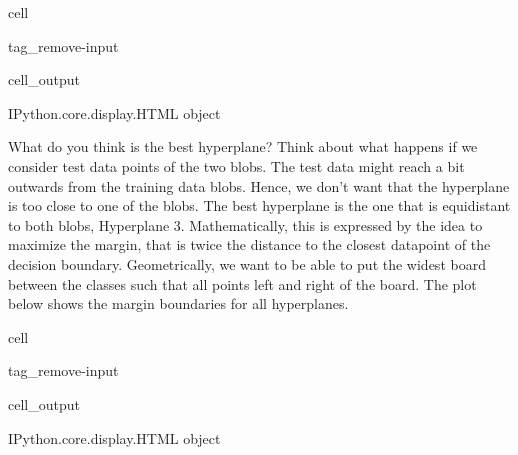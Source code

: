 \documentclass[letterpaper,10pt,english]{jupyterBook}
\begin{document}
\begin{sphinxuseclass}{cell}
\begin{sphinxuseclass}{tag_remove-input}\begin{sphinxVerbatimOutput}

\begin{sphinxuseclass}{cell_output}
\begin{sphinxVerbatim}[commandchars=\\\{\}]
\PYGZlt{}IPython.core.display.HTML object\PYGZgt{}
\end{sphinxVerbatim}

\end{sphinxuseclass}\end{sphinxVerbatimOutput}

\end{sphinxuseclass}
\end{sphinxuseclass}
\sphinxAtStartPar
What do you think is the best hyperplane? Think about what happens if we consider test data points of the two blobs. The test data might reach a bit outwards from the training data blobs. Hence, we don’t want that the hyperplane is too close to one of the blobs. The best hyperplane is the one that is equidistant to both blobs, Hyperplane 3. Mathematically, this is expressed by the idea to maximize the margin, that is twice the distance to the closest datapoint of the decision boundary. Geometrically, we want to be able to put the widest board between the classes such that all points left and right of the board. The plot below shows the margin boundaries for all hyperplanes.

\begin{sphinxuseclass}{cell}
\begin{sphinxuseclass}{tag_remove-input}\begin{sphinxVerbatimOutput}

\begin{sphinxuseclass}{cell_output}
\begin{sphinxVerbatim}[commandchars=\\\{\}]
\PYGZlt{}IPython.core.display.HTML object\PYGZgt{}
\end{sphinxVerbatim}

\end{sphinxuseclass}\end{sphinxVerbatimOutput}

\end{sphinxuseclass}
\end{sphinxuseclass}
\end{document}
